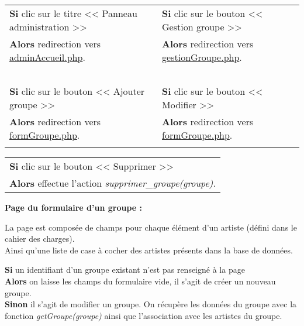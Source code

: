             \begin{center}
                \begin{tabular}{l | l}
                    \textbf{Si} clic sur le titre << Panneau administration >> & \textbf{Si} clic sur le bouton << Gestion groupe >> \\
                    \textbf{Alors} redirection vers \underline{adminAccueil.php}. & \textbf{Alors} redirection vers \underline{gestionGroupe.php}. \\ \\

                    \textbf{Si} clic sur le bouton << Ajouter groupe >> & \textbf{Si} clic sur le bouton << Modifier >> \\
                    \textbf{Alors} redirection vers \underline{formGroupe.php}. & \textbf{Alors} redirection vers \underline{formGroupe.php}. \\ \\
                \end{tabular}

                \begin{tabular}{l}
                    \textbf{Si} clic sur le bouton << Supprimer >> \\
                    \textbf{Alors} effectue l'action \emph{supprimer\_groupe(groupe)}.
                \end{tabular}
            \end{center}
            
            
        \clearpage
        
            \begin{paragraphe}
                \textbf{Page du formulaire d'un groupe :}
            \end{paragraphe}
            
            \begin{paragraphe}
                La page est composée de champs pour chaque élément d'un artiste (défini dans le cahier des charges). \\
                Ainsi qu'une liste de case à cocher des artistes présents dans la base de données.
            \end{paragraphe}

            \begin{paragraphe}
                \textbf{Si} un identifiant d'un groupe existant n'est pas renseigné à la page \\
                \textbf{Alors} on laisse les champs du formulaire vide, il s'agit de créer un nouveau groupe. \\
                \textbf{Sinon} il s'agit de modifier un groupe. On récupère les données du groupe avec la fonction \emph{getGroupe(groupe)} ainsi que l'association avec les artistes du groupe.
            \end{paragraphe}
            
